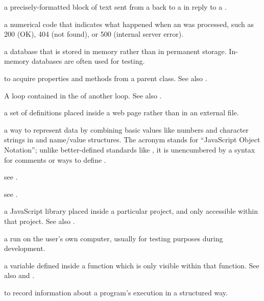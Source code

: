 \begin{description}
a precisely-formatted block of text sent from a  back to a
 in reply to a .

a numerical code that indicates what happened when an  was processed, such as 200 (OK), 404 (not found), or
500 (internal server error).

a database that is stored in memory rather than in permanent storage.
In-memory databases are often used for testing.

to acquire properties and methods from a parent class. See also
.

A loop contained in the  of another loop.
See also .

a set of  definitions placed inside a web page rather than in an
external file.

a way to represent data by combining basic values like numbers and character
strings in  and name/value structures. The acronym stands
for ``JavaScript Object Notation''; unlike better-defined standards like
, it is unencumbered by a syntax for comments or ways to define
.

see .

see .

a JavaScript library placed inside a particular project, and only accessible
within that project. See also .

a  run on the user's own computer, usually for testing
purposes during development.

a variable defined inside a function which is only visible within that
function. See also  and
.

to record information about a program's execution in a structured way.


\end{description}
